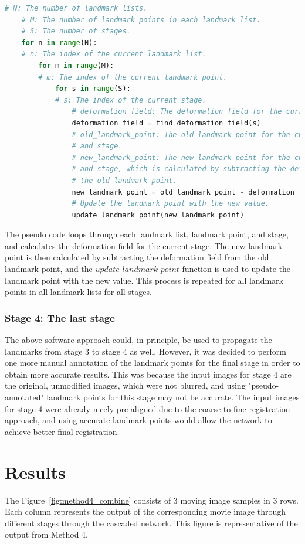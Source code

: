 \documentclass{report}
\begin{document}
	\begin{lstlisting}[language=Python]
	# N: The number of landmark lists.
	# M: The number of landmark points in each landmark list.
	# S: The number of stages.
	for n in range(N):
	# n: The index of the current landmark list.
		for m in range(M):
		# m: The index of the current landmark point.
			for s in range(S):
			# s: The index of the current stage.
				# deformation_field: The deformation field for the current stage.
				deformation_field = find_deformation_field(s)
				# old_landmark_point: The old landmark point for the current landmark point
				# and stage.
				# new_landmark_point: The new landmark point for the current landmark point
				# and stage, which is calculated by subtracting the deformation field from
				# the old landmark point.
				new_landmark_point = old_landmark_point - deformation_field
				# Update the landmark point with the new value.
				update_landmark_point(new_landmark_point)
	\end{lstlisting}
	
	The pseudo code loops through each landmark list, landmark point, and stage, and calculates the deformation field for the current stage. The new landmark point is then calculated by subtracting the deformation field from the old landmark point, and the $update\_landmark\_point$ function is used to update the landmark point with the new value. This process is repeated for all landmark points in all landmark lists for all stages.
	
	\subsubsection{Stage 4: The last stage}
	The above software approach could, in principle, be used to propagate the landmarks from stage 3 to stage 4 as well. However, it was decided to perform one more manual annotation of the landmark points for the final stage in order to obtain more accurate results. This was because the input images for stage 4 are the original, unmodified images, which were not blurred, and using "pseudo-annotated" landmark points for this stage may not be accurate. The input images for stage 4 were already nicely pre-aligned due to the coarse-to-fine registration approach, and using accurate landmark points would allow the network to achieve better final registration.
	
	\section{Results}
	The Figure~\ref{fig:method4_combine} consists of 3 moving image samples in 3 rows. Each column represents the output of the corresponding movie image through different stages through the cascaded network. This figure is representative of the output from Method 4.
	
\end{document}
